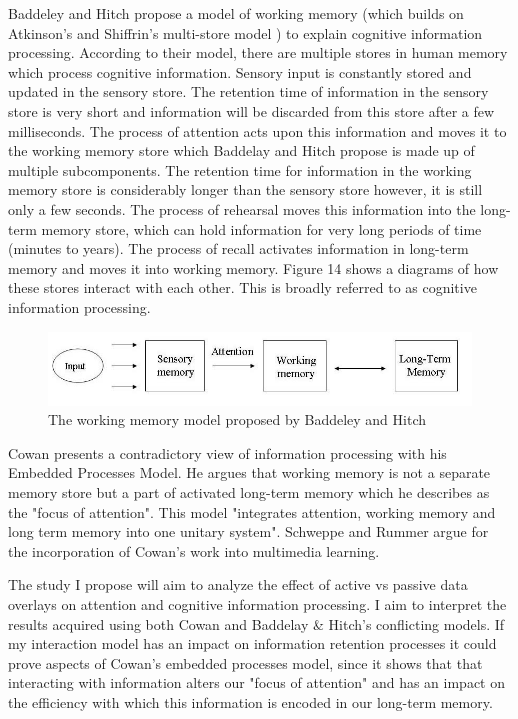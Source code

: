 \documentclass{article}
\begin{document}
Baddeley and Hitch \cite{baddeley1974working} propose a model of working memory (which builds on Atkinson’s and Shiffrin’s multi-store model \cite{atkinson1968human}) to explain cognitive information processing. According to their model, there are multiple stores in human memory which process cognitive information. Sensory input is constantly stored and updated in the sensory store. The retention time of information in the sensory store is very short and information will be discarded from this store after a few milliseconds. The process of attention acts upon this information and moves it to the working memory store which Baddelay and Hitch propose is made up of multiple subcomponents. The retention time for information in the working memory store is considerably longer than the sensory store however, it is still only a few seconds. The process of rehearsal moves this information into the long-term memory store, which can hold information for very long periods of time (minutes to years). The process of recall activates information in long-term memory and moves it into working memory. Figure 14 shows a diagrams of how these stores interact with each other. This is broadly referred to as cognitive information processing.  

\begin{figure}[htbp]
		
        \includegraphics[width=\textwidth]{Images/workMem.jpg}
    	\caption{The working memory model proposed by Baddeley and Hitch \cite{baddeley1974working}
}
\end{figure}

Cowan \cite{cowan1999embedded} presents a contradictory view of information processing with his Embedded Processes Model. He argues that working memory is not a separate memory store but a part of activated long-term memory which he describes as the "focus of attention". This model "integrates attention, working memory and long term memory into one unitary system". Schweppe and Rummer \cite{Schweppe2014} argue for the incorporation of Cowan's work into multimedia learning.  

The study I propose will aim to analyze the effect of active vs passive data overlays on attention and cognitive information processing. I aim to interpret the results acquired using both Cowan and Baddelay \& Hitch's conflicting models. If my interaction model has an impact on information retention processes it could prove aspects of Cowan's embedded processes model, since it shows that that interacting with information alters our "focus of attention" and has an impact on the efficiency with which this information is encoded in our long-term memory. 
\end{document}
